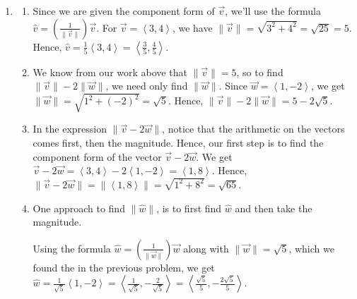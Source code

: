 \documentclass{ximera}
\begin{document}
\begin{example}
\begin{explanation}
\begin{enumerate}
 

Going through the usual calculations, we find $\cos(\theta) = \frac{1}{2}$ and $\sin(\theta) = -\frac{\sqrt{3}}{2}$.  Hence,  $\theta = \frac{5\pi}{3}$.  

 

We may check our answer by verifying $6\left<\cos\left(\frac{5\pi}{3}\right), \sin\left(\frac{5\pi}{3}\right) \right>  = \left<3, -3\sqrt{3}\right> = \overrightarrow{v}$.

\item  \begin{enumerate} \item  Since we are given the component form of $\overrightarrow{v}$, we'll use the formula $\hat{v} = \left(\frac{1}{\|\overrightarrow{v}\|}\right) \overrightarrow{v}$.  For $\overrightarrow{v} = \left<3,4\right>$, we have $\| \overrightarrow{v} \| = \sqrt{3^2+4^2} = \sqrt{25} = 5$.  Hence, $\hat{v} = \frac{1}{5} \left< 3, 4 \right> = \left<\frac{3}{5}, \frac{4}{5}\right>$.


\item  We know from our work above that $\| \overrightarrow{v} \| = 5$, so to find  $\| \overrightarrow{v} \| -2 \|\overrightarrow{w}\|$, we need only find $\| \overrightarrow{w} \|$.  Since $\overrightarrow{w} = \left<1, -2\right>$, we get $\| \overrightarrow{w} \| = \sqrt{1^2+(-2)^2} = \sqrt{5}$.  Hence, $\| \overrightarrow{v} \| -2 \|\overrightarrow{w}\| = 5 - 2\sqrt{5}$.

\item  In the expression $\| \overrightarrow{v} -2\overrightarrow{w}\|$, notice that the arithmetic on the vectors comes first, then the magnitude.  Hence, our first step is to find the component form of the vector $\overrightarrow{v} - 2\overrightarrow{w}$.  We get $\overrightarrow{v} - 2 \overrightarrow{w} = \left<3,4\right> - 2\left<1,-2\right> = \left<1, 8\right>$.  Hence,  $\| \overrightarrow{v} -2\overrightarrow{w}\| =  \| \left<1, 8\right>\| = \sqrt{1^2+8^2} = \sqrt{65}$.

\item  One approach to find $\| \hat{w} \|$, is to first find $\hat{w}$ and then take the magnitude.

 

Using the formula  $\hat{w} = \left(\frac{1}{\| \overrightarrow{w} \|}\right) \overrightarrow{w}$ along with $\| \overrightarrow{w} \| = \sqrt{5}$, which we found the in the previous problem, we get  $\hat{w} = \frac{1}{\sqrt{5}} \left<1, -2\right> = \left< \frac{1}{\sqrt{5}}, -\frac{2}{\sqrt{5}}\right>  = \left< \frac{\sqrt{5}}{5}, -\frac{2\sqrt{5}}{5}\right>$.   


\end{enumerate}
\end{enumerate}
\end{explanation}
\end{example}
\end{document}
